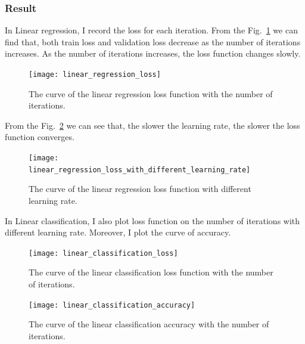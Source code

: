 \documentclass[journal, a4paper]{IEEEtran}
\begin{document}
\subsubsection{Result}

In Linear regression, I record the loss for each iteration. 
From the Fig.~\ref{fig:linear_regression_loss} we can find that, both train loss and validation loss decrease as the number of iterations increases.
As the number of iterations increases, the loss function changes slowly.

\begin{figure}[!hbt]
    \begin{center}
    \texttt{[image: linear\_regression\_loss]}
    \caption{The curve of the linear regression loss function with the number of iterations.}
    \label{fig:linear_regression_loss}
    \end{center}
\end{figure}

From the Fig.~\ref{fig:linear_regression_loss_with_different_learning_rate} we can see that, the slower the learning rate, the slower the loss function converges.

\begin{figure}[!hbt]
    \begin{center}
    \texttt{[image: linear\_regression\_loss\_with\_different\_learning\_rate]}
    \caption{The curve of the linear regression loss function with different learning rate.}
    \label{fig:linear_regression_loss_with_different_learning_rate}
    \end{center}
\end{figure}

In Linear classification, I also plot loss function on the number of iterations with different learning rate.
Moreover, I plot the curve of accuracy.

\begin{figure}[!hbt]
    \begin{center}
    \texttt{[image: linear\_classification\_loss]}
    \caption{The curve of the linear classification loss function with the number of iterations.}
    \label{fig:linear_classification_loss}
    \end{center}
\end{figure}

\begin{figure}[!hbt]
    \begin{center}
    \texttt{[image: linear\_classification\_accuracy]}
    \caption{The curve of the linear classification accuracy with the number of iterations.}
    \label{fig:linear_classification_accuracy}
    \end{center}
\end{figure}
\end{document}
